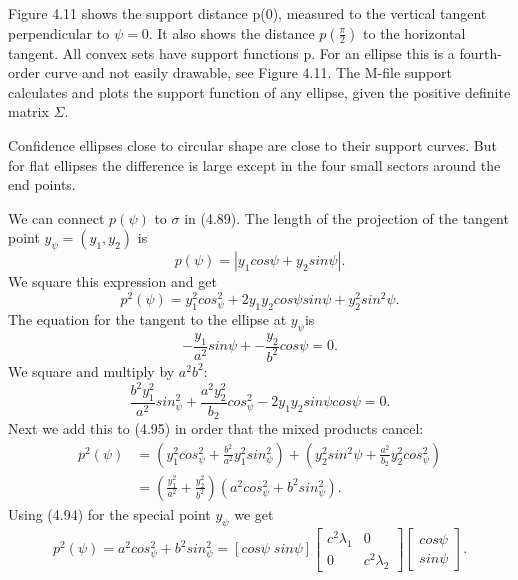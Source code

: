 	Figure 4.11 shows the support distance p(0), measured to the vertical tangent perpendicular to $\psi=0$. It also shows the distance $p(\frac{\pi}{2})$ to the horizontal tangent. All convex
	sets have support functions p. For an ellipse this is a fourth-order curve and not easily
	drawable, see Figure 4.11. The M-file support calculates and plots the support function of
	any ellipse, given the positive definite matrix $\Sigma$.
	
	Confidence ellipses close to circular shape are close to their support curves. But for
	flat ellipses the difference is large except in the four small sectors around the end points.
	
	We can connect $p(\psi)$ to $\sigma$ in (4.89). The length of the projection of the tangent
	point $y_\psi=(y_1,y_2)$ is
	\begin{equation*}
	p(\psi)=|y_1cos\psi+y_2sin\psi|.
	\end{equation*}
	We square this expression and get
	\begin{equation}
	p^2(\psi)=y^2_1cos^2_\psi+2y_1y_2cos\psi sin\psi+y^2_2sin^2\psi.
	\end{equation}
	The equation for the tangent to the ellipse at $y_\psi$is
	\begin{equation*}
	-\frac{y_1}{a^2}sin\psi+-\frac{y_2}{b^2}cos\psi=0.
	\end{equation*}
	We square and multiply by $a^2b^2$:
	\begin{equation*}
	\frac{b^2y^2_1}{a^2}sin^2_\psi+\frac{a^2y^2_2}{b_2}cos^2_\psi-2y_1y_2sin\psi cos\psi=0.
	\end{equation*}
	Next we add this to (4.95) in order that the mixed products cancel:
	\begin{equation*}
	\begin{split}
	p^2(\psi)&=(y^2_1cos^2_\psi+\frac{b^2}{a^2}y^2_1sin^2_\psi)+(y^2_2sin^2\psi+\frac{a^2}{b_2}y^2_2cos^2_\psi)\\
	&=(\frac{y^2_1}{a^2}+\frac{y^2_2}{b^2})(a^2cos^2_\psi + b^2sin^2_\psi).
	\end{split}
	\end{equation*} 
	Using (4.94) for the special point $y_\psi$ we get
	\begin{equation*}
	p^2(\psi)=a^2cos^2_\psi + b^2sin^2_\psi=[cos\psi\;sin\psi]\begin{bmatrix}
	c^2\lambda_1 & 0\\ 0&c^2\lambda_2
	\end{bmatrix}
	\begin{bmatrix}
	cos\psi \\ sin\psi
	\end{bmatrix}.
	\end{equation*}
